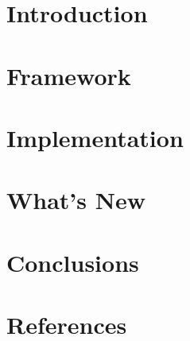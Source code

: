 \section[Intro]{Introduction}


\section[Frm]{Framework}


\section[Impl]{Implementation}


\section[New]{What's New}


\section[Concl]{Conclusions}


\section[Refs]{References}

